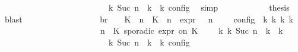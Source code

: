 \begin{isabellebody}
\ \ \ \ \ \ \ \ \ \ \ \ \ \ \ \ \ \ \ \ \ \ {\isasymand}\ {\isasymrho}\ {\isasymin}\ {\isasymlbrakk}\ {\isasymGamma}\isactrlsub k{\isacharcomma}\ Suc\ n\ {\isasymturnstile}\ {\isasymPsi}\isactrlsub k\ {\isasymtriangleright}\ {\isasymPhi}\isactrlsub k\ {\isasymrbrakk}\isactrlsub c\isactrlsub o\isactrlsub n\isactrlsub f\isactrlsub i\isactrlsub g{\isacartoucheclose}\ \isamarkupfalse%
\ simp\isanewline
\ \ \ \ \ \ \ \ \ \ \isamarkupfalse%
\ {\isacharquery}thesis\ \isamarkupfalse%
\ blast\isanewline
\ \ \ \ \ \ \ \ \isamarkupfalse%
\isanewline
\ \ \ \ \ \ \isamarkupfalse%
\ \isamarkupfalse%
\ br{}{\isacharcolon}\ {\isacartoucheopen}{\isasymrho}\ {\isasymin}\ {\isasymlbrakk}\ {\isacharparenleft}{\isacharparenleft}K\ {\isasymUp}\ n{\isacharparenright}\ {\isacharhash}\ {\isacharparenleft}K\ {\isasymDown}\ n\ {\isacharat}{\isasymsharp}\ {\isasymtau}\isactrlsub e\isactrlsub x\isactrlsub p\isactrlsub r{\isacharparenright}\ {\isacharhash}\ {\isasymGamma}{\isacharparenright}{\isacharcomma}\ n\ {\isasymturnstile}\ {\isasymPsi}\ {\isasymtriangleright}\ {\isasymPhi}\ {\isasymrbrakk}\isactrlsub c\isactrlsub o\isactrlsub n\isactrlsub f\isactrlsub i\isactrlsub g\ {\isasymLongrightarrow}\ {\isasymexists}{\isasymGamma}\isactrlsub k\ {\isasymPsi}\isactrlsub k\ {\isasymPhi}\isactrlsub k\ k{\isachardot}\isanewline
\ \ \ \ \ \ \ \ \ \ \ \ \ \ \ \ \ \ \ \ \ \ \ {\isacharparenleft}{\isacharparenleft}{\isasymGamma}{\isacharcomma}\ n\ {\isasymturnstile}\ {\isacharparenleft}{\isacharparenleft}K\ sporadic{\isasymsharp}\ {\isasymtau}\isactrlsub e\isactrlsub x\isactrlsub p\isactrlsub r\ on\ K\ {\isacharhash}\ {\isasymPsi}{\isacharparenright}\ {\isasymtriangleright}\ {\isasymPhi}{\isacharparenright}\ {\isasymhookrightarrow}\isactrlbsup k\isactrlesup \ {\isacharparenleft}{\isasymGamma}\isactrlsub k{\isacharcomma}\ Suc\ n\ {\isasymturnstile}\ {\isasymPsi}\isactrlsub k\ {\isasymtriangleright}\ {\isasymPhi}\isactrlsub k{\isacharparenright}{\isacharparenright}\isanewline
\ \ \ \ \ \ \ \ \ \ \ \ \ \ \ \ \ \ \ \ \ \ {\isasymand}\ {\isasymrho}\ {\isasymin}\ {\isasymlbrakk}\ {\isasymGamma}\isactrlsub k{\isacharcomma}\ Suc\ n\ {\isasymturnstile}\ {\isasymPsi}\isactrlsub k\ {\isasymtriangleright}\ {\isasymPhi}\isactrlsub k\ {\isasymrbrakk}\isactrlsub c\isactrlsub o\isactrlsub n\isactrlsub f\isactrlsub i\isactrlsub g{\isacartoucheclose}\isanewline
\ \ \ \ \ \ \ \ \isamarkupfalse%

\end{isabellebody}
